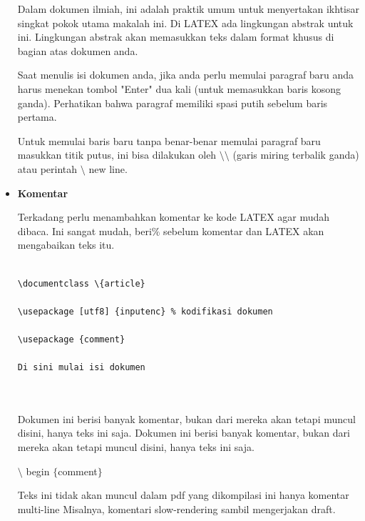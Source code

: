 \begin{itemize}
Dalam dokumen ilmiah, ini adalah praktik umum untuk menyertakan ikhtisar singkat pokok utama makalah ini. Di LATEX ada lingkungan abstrak untuk ini. Lingkungan abstrak akan memasukkan teks dalam format khusus di bagian atas dokumen anda.\par
\vspace{\baselineskip}
Saat menulis isi dokumen anda, jika anda perlu memulai paragraf baru anda harus menekan tombol "Enter" dua kali (untuk memasukkan baris kosong ganda). Perhatikan bahwa paragraf memiliki spasi putih sebelum baris pertama.\par
\vspace{\baselineskip}
Untuk memulai baris baru tanpa benar-benar memulai paragraf baru masukkan titik putus, ini bisa dilakukan oleh $\setminus$$\setminus$ (garis miring terbalik ganda) atau perintah $\setminus$ new line.\par
\vspace{\baselineskip}
\vspace{10pt}
	\item {\fontsize{14pt}{14pt}\selectfont \textbf{Komentar}}\par
\vspace{\baselineskip}
Terkadang perlu menambahkan komentar ke kode LATEX agar mudah dibaca. Ini sangat mudah, beri$\%$ sebelum komentar dan LATEX akan mengabaikan teks itu.\par
\begin{verbatim}

\documentclass \{article} 

\usepackage [utf8] {inputenc} % kodifikasi dokumen

\usepackage {comment} 

Di sini mulai isi dokumen



\end{verbatim}

\hspace*{0.5in}Dokumen ini berisi banyak komentar, bukan dari mereka akan tetapi muncul disini, hanya teks ini saja. Dokumen ini berisi banyak komentar, bukan dari mereka akan tetapi muncul disini, hanya teks ini saja.\par

\hspace*{0.5in}$\setminus$ begin $ \{ $comment$ \} $\par

\hspace*{0.5in}Teks ini tidak akan muncul dalam pdf yang dikompilasi ini hanya komentar multi-line Misalnya, komentari slow-rendering sambil mengerjakan draft.\par


\end{itemize}
